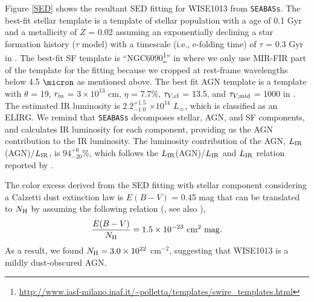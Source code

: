 \documentclass[twocolumn]{aastex6}
\begin{document}
Figure \ref{SED} shows the resultant SED fitting for WISE1013 from {\tt SEABASs}.
The best-fit stellar template is a template of stellar population with a age of 0.1 Gyr and a metallicity of $Z$ = 0.02 assuming an exponentially declining a star formation history ($\tau$ model) with a timescale (i.e., e-folding time) of $\tau$ = 0.3 Gyr in \cite{Bruzual}.
The best-fit SF template is ``NGC6090\footnote{\url{http://www.iasf-milano.inaf.it/~polletta/templates/swire_templates.html}}'' in \cite{Polletta} where we only use MIR-FIR part of the template for the fitting because we cropped at rest-frame wavelengths below 4.5 $\micron$ as mentioned above.
The best fit AGN template is a template with $\theta$ = 19\arcdeg, $r_{\rm in}$ = $3\times10^{13}$ cm, $\eta$ = 7.7\%, $\tau_{V,{\rm cl}}$ = 13.5, and $\tau_{V,{\rm mid}}$ = 1000 in \cite{Siebenmorgen}.
The estimated IR luminosity is  $2.2^{+1.5}_{-1.0}$ $\times 10^{14}$ $L_{\sun}$, which is classified as an ELIRG.
We remind that {\tt SEABASs} decomposes stellar, AGN, and SF components, and calculates IR luminosity for each component, providing us the AGN contribution to the IR luminosity.
The luminosity contribution of the AGN, $L_{\rm IR}$(AGN)/$L_{\rm IR}$, is $94^{+6}_{-20}$\%, which follows the $L_{\rm IR}$(AGN)/$L_{\rm IR}$ and $L_{\rm IR}$ relation reported by \cite{Toba_17b}. 

The color excess derived from the SED fitting with stellar component considering a Calzetti dust extinction law is $E (B-V)$ = 0.45 mag that can be translated to $N_{\rm H}$ by assuming the following relation (\citealt{Ricci_a}, see also \citealt{Maiolino}),
\begin{equation}
\frac{E(B-V)}{N_{\rm H}} = 1.5 \times 10^{-23}\,\,{\rm cm^2} \,\, {\rm mag}.
\end{equation}
As a result, we found $N_{\rm H} = 3.0 \times 10^{22}$ cm$^{-2}$, suggesting that WISE1013 is a mildly dust-obscured AGN.
\end{document}
